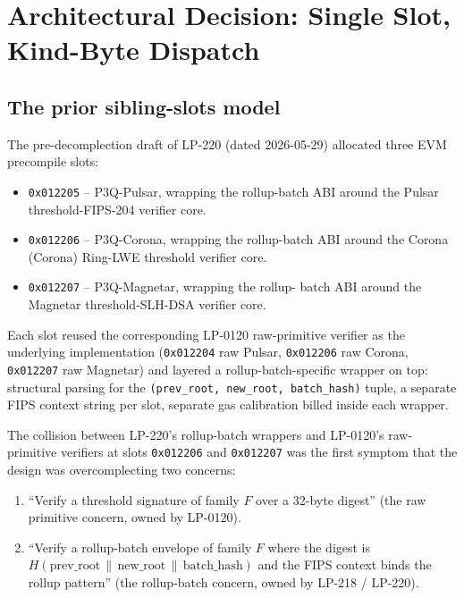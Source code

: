 \section{Architectural Decision: Single Slot, Kind-Byte Dispatch}
\label{sec:architectural-decision}

\subsection{The prior sibling-slots model}

The pre-decomplection draft of LP-220 (dated 2026-05-29)
allocated three EVM precompile slots:

\begin{itemize}[leftmargin=2em,nosep]
\item \texttt{0x012205} -- P3Q-Pulsar, wrapping the rollup-batch
  ABI around the Pulsar threshold-FIPS-204 verifier core.
\item \texttt{0x012206} -- P3Q-Corona, wrapping the rollup-batch
  ABI around the Corona (Corona) Ring-LWE threshold verifier
  core.
\item \texttt{0x012207} -- P3Q-Magnetar, wrapping the rollup-
  batch ABI around the Magnetar threshold-SLH-DSA verifier core.
\end{itemize}

Each slot reused the corresponding LP-0120 raw-primitive verifier
as the underlying implementation (\texttt{0x012204} raw Pulsar,
\texttt{0x012206} raw Corona, \texttt{0x012207} raw Magnetar) and
layered a rollup-batch-specific wrapper on top: structural
parsing for the \texttt{(prev\_root, new\_root, batch\_hash)}
tuple, a separate FIPS context string per slot, separate gas
calibration billed inside each wrapper.

The collision between LP-220's rollup-batch wrappers and
LP-0120's raw-primitive verifiers at slots \texttt{0x012206} and
\texttt{0x012207} was the first symptom that the design was
overcomplecting two concerns:

\begin{enumerate}[leftmargin=2em,nosep]
\item ``Verify a threshold signature of family $F$ over a 32-byte
  digest'' (the raw primitive concern, owned by LP-0120).
\item ``Verify a rollup-batch envelope of family $F$ where the
  digest is $H(\text{prev\_root} \,\|\, \text{new\_root} \,\|\,
  \text{batch\_hash})$ and the FIPS context binds the rollup
  pattern'' (the rollup-batch concern, owned by LP-218 /
  LP-220).
\end{enumerate}

